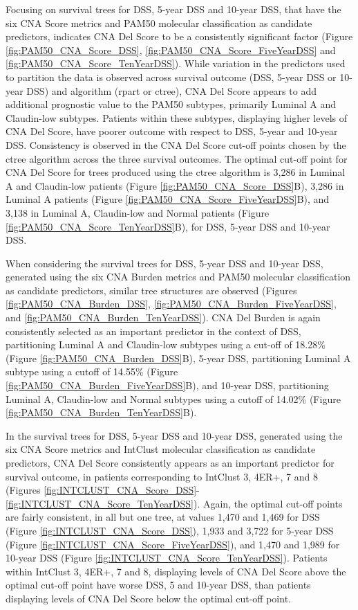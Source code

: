 Focusing on survival trees for DSS, 5-year DSS and 10-year DSS, that have the six CNA Score metrics and PAM50 molecular classification as candidate predictors, indicates CNA Del Score to be a consistently significant factor (Figure \ref{fig:PAM50_CNA_Score_DSS}, \ref{fig:PAM50_CNA_Score_FiveYearDSS} and \ref{fig:PAM50_CNA_Score_TenYearDSS}). While variation in the predictors used to partition the data is observed across survival outcome (DSS, 5-year DSS or 10-year DSS) and algorithm (rpart or ctree), CNA Del Score appears to add additional prognostic value to the PAM50 subtypes, primarily Luminal A and Claudin-low subtypes. Patients within these subtypes, displaying higher levels of CNA Del Score, have poorer outcome with respect to DSS, 5-year and 10-year DSS. Consistency is observed in the CNA Del Score cut-off points chosen by the ctree algorithm across the three survival outcomes. The optimal cut-off point for CNA Del Score for trees produced using the ctree algorithm is 3,286 in Luminal A and Claudin-low patients (Figure \ref{fig:PAM50_CNA_Score_DSS}B), 3,286 in Luminal A patients (Figure \ref{fig:PAM50_CNA_Score_FiveYearDSS}B), and 3,138 in Luminal A, Claudin-low and Normal patients (Figure \ref{fig:PAM50_CNA_Score_TenYearDSS}B), for DSS, 5-year DSS and 10-year DSS. 

When considering the survival trees for DSS, 5-year DSS and 10-year DSS, generated using the six CNA Burden metrics and PAM50 molecular classification as candidate predictors, similar tree structures are observed (Figures \ref{fig:PAM50_CNA_Burden_DSS}, \ref{fig:PAM50_CNA_Burden_FiveYearDSS}, and \ref{fig:PAM50_CNA_Burden_TenYearDSS}). CNA Del Burden is again consistently selected as an important predictor in the context of DSS, partitioning Luminal A and Claudin-low subtypes using a cut-off of 18.28\% (Figure \ref{fig:PAM50_CNA_Burden_DSS}B), 5-year DSS, partitioning Luminal A subtype using a cutoff of 14.55\% (Figure \ref{fig:PAM50_CNA_Burden_FiveYearDSS}B), and 10-year DSS, partitioning Luminal A, Claudin-low and Normal subtypes using a cutoff of 14.02\% (Figure \ref{fig:PAM50_CNA_Burden_TenYearDSS}B). 

In the survival trees for DSS, 5-year DSS and 10-year DSS, generated using the six CNA Score metrics and IntClust molecular classification as candidate predictors, CNA Del Score consistently appears as an important predictor for survival outcome, in patients corresponding to IntClust 3, 4ER+, 7 and 8 (Figures \ref{fig:INTCLUST_CNA_Score_DSS}-\ref{fig:INTCLUST_CNA_Score_TenYearDSS}). Again, the optimal cut-off points are fairly consistent, in all but one tree, at values 1,470 and 1,469 for DSS (Figure \ref{fig:INTCLUST_CNA_Score_DSS}), 1,933 and 3,722 for 5-year DSS (Figure \ref{fig:INTCLUST_CNA_Score_FiveYearDSS}), and 1,470 and 1,989 for 10-year DSS (Figure \ref{fig:INTCLUST_CNA_Score_TenYearDSS}). Patients within IntClust 3, 4ER+, 7 and 8, displaying levels of CNA Del Score above the optimal cut-off point have worse DSS, 5 and 10-year DSS, than patients displaying levels of CNA Del Score below the optimal cut-off point. 


